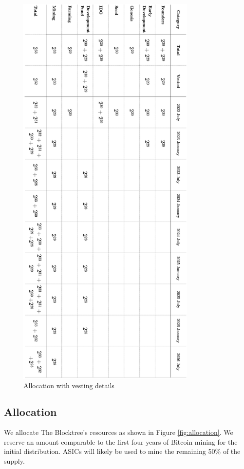 \documentclass[12pt]{article}
\begin{document}
\begin{figure}[H]
\centering
  \includegraphics[width=3.5in]{images/The_Blocktree_Allocation_Table.png}
  \caption{Allocation with vesting details}
  \label{fig:allocation_table}
\end{figure}




\subsection{Allocation}

We allocate The Blocktree's resources as shown in Figure \ref{fig:allocation}. 
We reserve an amount comparable to the first four years of Bitcoin mining for the initial distribution.  ASICs will likely be used to mine the remaining 50\% of the supply.
\end{document}
